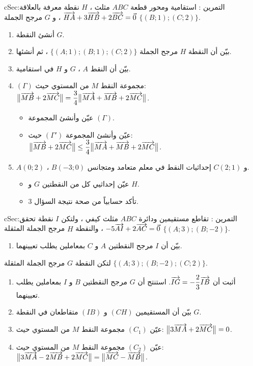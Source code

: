 \documentclass[12pt,a4paper]{article}
\newenvironment{BOX}[2]{\begin{otherlanguage}{english}\begin{arbox}{#1}{#2}}{\end{arbox}\end{otherlanguage}}
\newcounter{exo}
\newenvironment{tamrin}[1]{\stepcounter{exo}\begin{BOX}{cSec}{التمرين \theexo: #1}}{\end{BOX}}
\newenvironment{sq}{\begin{itemize}[leftmargin=2.4em,itemsep=3pt]}{\end{itemize}}
\newcommand{\qa}{\item[(أ)]}\newcommand{\qb}{\item[(ب)]}\newcommand{\qc}{\item[(جـ)]}\newcommand{\qd}{\item[(د)]}\newcommand{\qe}{\item[(هـ)]}
\begin{document}
\begin{tamrin}{استقامية ومحور قطعة}
$ABC$ مثلث ، $H$ نقطة معرفة بالعلاقة: $\overrightarrow{HA}+3\overrightarrow{HB}+2\overrightarrow{BC}=\vec0$ ، و $G$ مرجح الجملة $\{(B;1);(C;2)\}$.
\begin{enumerate}
\item أنشئ النقطة $G$.
\item بيّن أن النقطة $H$ مرجح الجملة $\{(A;1);(B;1);(C;2)\}$ ، ثم أنشئها.
\item بيّن أن النقط $A$ ، $G$ و $H$ في استقامية.
\item $(\Gamma)$ مجموعة النقط $M$ من المستوي حيث: $\big\|\overrightarrow{MB}+2\overrightarrow{MC}\big\|=\dfrac34\big\|\overrightarrow{MA}+\overrightarrow{MB}+2\overrightarrow{MC}\big\|$.
\begin{sq}
\qa عيّن وأنشئ المجموعة $(\Gamma)$.
\qb عيّن وأنشئ المجموعة $(\Gamma')$ حيث: $\big\|\overrightarrow{MB}+2\overrightarrow{MC}\big\|\le\dfrac34\big\|\overrightarrow{MA}+\overrightarrow{MB}+2\overrightarrow{MC}\big\|$.
\end{sq}
\item $A(0;2)$ ، $B(-3;0)$ و $C(2;1)$ إحداثيات النقط في معلم متعامد ومتجانس.
\begin{sq}
\qa عيّن إحداثيي كل من النقطتين $G$ و $H$.
\qb تأكد حسابياً من صحة نتيجة السؤال 3.
\end{sq}
\end{enumerate}
\end{tamrin}

\begin{tamrin}{تقاطع مستقيمين ودائرة}
$ABC$ مثلث كيفي ، ولتكن $I$ نقطة تحقق: $-5\overrightarrow{AI}+2\overrightarrow{AC}=\vec0$ ، والنقطة $H$ مرجح الجملة المثقلة $\{(A;3);(B;-2)\}$.
\begin{enumerate}
\item بيّن أن $I$ مرجح النقطتين $A$ و $C$ بمعاملين يطلب تعيينهما.
\end{enumerate}
لتكن النقطة $G$ مرجح الجملة المثقلة $\{(A;3);(B;-2);(C;2)\}$.
\begin{enumerate}[resume]
\item أثبت أن $\overrightarrow{IG}=-\dfrac23\overrightarrow{IB}$. استنتج أن $G$ مرجح النقطتين $B$ و $I$ بمعاملين يطلب تعيينهما.
\item بيّن أن المستقيمين $(CH)$ و $(IB)$ متقاطعان في النقطة $G$.
\item عيّن $(C_1)$ مجموعة النقط $M$ من المستوي حيث: $\big\|3\overrightarrow{MA}+2\overrightarrow{MC}\big\|=0$.
\item عيّن $(C_2)$ مجموعة النقط $M$ من المستوي حيث: $\big\|3\overrightarrow{MA}-2\overrightarrow{MB}+2\overrightarrow{MC}\big\|=\big\|\overrightarrow{MC}-\overrightarrow{MB}\big\|$.
\end{enumerate}
\end{tamrin}
\end{document}
